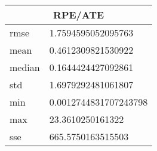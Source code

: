 \begin{table}[!ht] 
 \centering 
 \begin{tabular}{|l|l|} \hline 
 \multicolumn{2}{|c|}{RPE/ATE} \\ \hline 
 rmse & 1.7594595052095763 \\ \hline 
mean & 0.4612309821530922 \\ \hline 
median & 0.1644424427092861 \\ \hline 
std & 1.6979292481061807 \\ \hline 
min & 0.0012744831707243798 \\ \hline 
max & 23.3610250161322 \\ \hline 
sse & 665.5750163515503 \\ \hline 
\end{tabular} 
 \end{table}